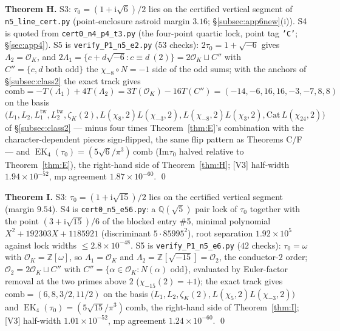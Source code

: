 \documentclass[11pt]{article}
\newcommand{\Qq}{\mathbb{Q}}
\newcommand{\Zz}{\mathbb{Z}}
\newcommand{\ii}{\mathrm{i}}
\newcommand{\OO}{\mathcal{O}}
\newcommand{\ImT}{\mathrm{Im}}
\DeclareMathOperator{\EK}{EK}
\theoremstyle{definition}
\theoremstyle{remark}
\begin{document}
\textbf{Theorem H.} S3: $\tau_0=(1+\ii\sqrt6)/2$ lies on the
certified vertical segment of \texttt{n5\_line\_cert.py}
(point-enclosure astroid margin $3.16$; \S\ref{subsec:app6new}(i)).
S4 is quoted from \texttt{cert0\_n4\_p4\_t3.py} (the four-point
quartic lock, point tag \texttt{'C'}; \S\ref{sec:app4}). S5 is
\texttt{verify\_P1\_n5\_e2.py} ($53$ checks): $2\tau_0=1+\sqrt{-6}$
gives $\Lambda_2=\OO_K$, and
$2\Lambda_1=\{c+d\sqrt{-6}:c\equiv d\ (2)\}
=2\OO_K\sqcup C''$ with $C''=\{c,d\text{ both odd}\}$ the
$\chi_{-8}\circ N=-1$ side of the odd sums; with the anchors of
\S\ref{subsec:class2} the exact track gives
\[
  \mathrm{comb}=-T(\Lambda_1)+4T(\Lambda_2)=3T(\OO_K)-16T(C'')
  =(-14,-6,16,16,-3,-7,8,8)
\]
on the basis
$\bigl(L_1,L_2,L_1^{\mathrm{tw}},L_2^{\mathrm{tw}},\zeta_K(2),
L(\chi_8,2)L(\chi_{-3},2),L(\chi_{-8},2)L(\chi_3,2),
\mathrm{Cat}\,L(\chi_{24},2)\bigr)$ of \S\ref{subsec:class2} ---
minus four times Theorem~\ref{thm:E}'s combination with the
character-dependent pieces sign-flipped, the same flip pattern as
Theorems C/F --- and
$\EK_4(\tau_0)=(5\sqrt6/\pi^3)\,\mathrm{comb}$ ($\ImT\tau_0$
halved relative to Theorem~\ref{thm:E}), the right-hand side of
Theorem~\ref{thm:H}; [V3] half-width $1.94\times10^{-52}$, mp
agreement $1.87\times10^{-60}$. \qed

\textbf{Theorem I.} S3: $\tau_0=(1+\ii\sqrt{15})/2$ lies on the
certified vertical segment (margin $9.54$). S4 is
\texttt{cert0\_n5\_e56.py}: a $\Qq(\sqrt5)$ pair lock of $\tau_0$
together with the point $(3+\ii\sqrt{15})/6$ of the blocked entry
\#5, minimal polynomial $X^2+192303X+1185921$ (discriminant
$5\cdot85995^2$), root separation $1.92\times10^{5}$ against lock
widths $\le2.8\times10^{-48}$. S5 is \texttt{verify\_P1\_n5\_e6.py}
($42$ checks): $\tau_0=\omega$ with $\OO_K=\Zz[\omega]$, so
$\Lambda_1=\OO_K$ and $\Lambda_2=\Zz[\sqrt{-15}]=\OO_2$, the
conductor-$2$ order; $\OO_2=2\OO_K\sqcup C''$ with
$C''=\{\alpha\in\OO_K:N(\alpha)\text{ odd}\}$, evaluated by
Euler-factor removal at the two primes above $2$
($\chi_{-15}(2)=+1$); the exact track gives
$\mathrm{comb}=(6,8,3/2,11/2)$ on the basis
$\bigl(L_1,L_2,\zeta_K(2),L(\chi_5,2)L(\chi_{-3},2)\bigr)$ and
$\EK_4(\tau_0)=(5\sqrt{15}/\pi^3)\,\mathrm{comb}$, the right-hand
side of Theorem~\ref{thm:I}; [V3] half-width $1.01\times10^{-52}$,
mp agreement $1.24\times10^{-60}$. \qed
\end{document}
